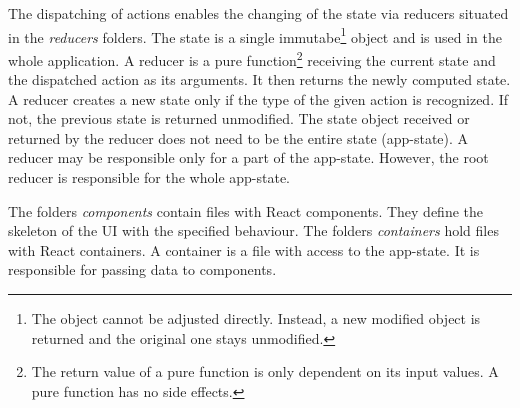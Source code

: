 The dispatching of actions enables the changing of the state via reducers situated in the \textit{reducers} folders. The state is a single immutabe\footnote{The object cannot be adjusted directly. Instead, a new modified object is returned and the original one stays unmodified.} object and is used in the whole application. A \hypertarget{reducers}{reducer} is a pure function\footnote{The return value of a pure function is only dependent on its input values. A pure function has no side effects.} receiving the current state and the dispatched action as its arguments. It then returns the newly computed state. A reducer creates a new state only if the type of the given action is recognized. If not, the previous state is returned unmodified. The state object received or returned by the reducer does not need to be the entire state (app-state). A reducer may be responsible only for a part of the app-state. However, the root reducer is responsible for the whole app-state.

The folders \textit{components} contain files with React components. They define the skeleton of the UI with the specified behaviour. The folders \textit{containers} hold files with React containers. A container is a file with access to the app-state. It is responsible for passing data to components. 

